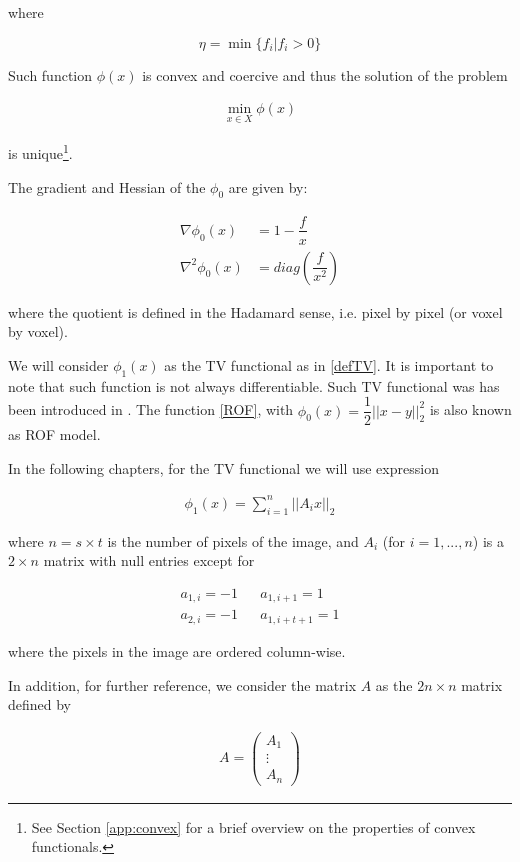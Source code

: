 where

$$\eta = \min \{ f_i | f_i > 0 \} $$

Such function $\phi(x)$ is convex and coercive and thus the solution of the problem

\begin{align}
\label{ROF}
\min_{x \in X} \phi(x)
\end{align}

is unique\footnote{See Section \ref{app:convex} for a brief overview on the properties of convex functionals.}.

The gradient and Hessian of the $\phi_0$ are given by:

\begin{align*}
\nabla \phi_0 (x) &= 1 - \dfrac{f}{x} \\
\nabla^2 \phi_0 (x) &= diag\left(\dfrac{f}{x^2}\right)
\end{align*}

where the quotient is defined in the Hadamard sense, i.e. pixel by pixel (or voxel by voxel).

We will consider $\phi_1(x)$ as the TV functional as in \eqref{defTV}. It is important to note that such function is not always differentiable. Such TV functional was has been introduced in \citep{rof}. The function \eqref{ROF}, with $\phi_0(x) = \dfrac{1}{2}||x-y||_2^2$ is also known as ROF model.

In the following chapters, for the TV functional we will use expression

\begin{align}
\phi_1(x) = \sum_{i=1}^n ||A_i x||_2
\end{align}

where $n = s \times t$ is the number of pixels of the image, and $A_i$ (for $i=1,...,n$) is a $2 \times n$ matrix with null entries except for

\begin{align*}
a_{1,i} = -1 && a_{1,i+1} = 1 \\
a_{2,i} = -1 && a_{1,i+t+1} = 1
\end{align*}

where the pixels in the image are ordered column-wise.

In addition, for further reference, we consider the matrix $A$ as the $2n \times n$ matrix defined by

\begin{align} \label{matrixA}
A = \begin{pmatrix}
A_1 \\
\vdots \\
A_n
\end{pmatrix}
\end{align} 